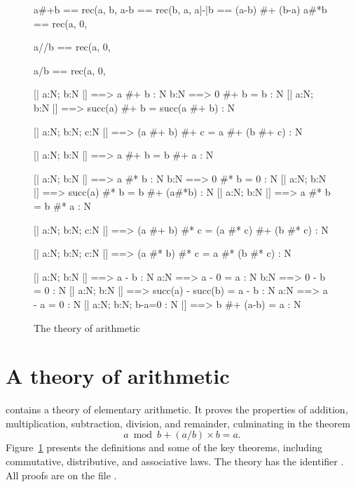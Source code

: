 \begin{figure} 
\begin{ttbox}
           a#+b  == rec(a, b, %
          a-b   == rec(b, a, %
       a|-|b == (a-b) #+ (b-a)  
          a#*b  == rec(a, 0, %

   a//b == rec(a, 0,

   a/b == rec(a, 0,
\end{ttbox}

\begin{ttbox}
        [| a:N;  b:N |] ==> a #+ b : N
             b:N ==> 0 #+ b = b : N
         [| a:N;  b:N |] ==> succ(a) #+ b = succ(a #+ b) : N

         [| a:N;  b:N;  c:N |] ==> 
                  (a #+ b) #+ c = a #+ (b #+ c) : N

       [| a:N;  b:N |] ==> a #+ b = b #+ a : N

       [| a:N;  b:N |] ==> a #* b : N
            b:N ==> 0 #* b = 0 : N
        [| a:N;  b:N |] ==> succ(a) #* b = b #+ (a#*b) : N
      [| a:N;  b:N |] ==> a #* b = b #* a : N

     [| a:N;  b:N;  c:N |] ==> 
                  (a #+ b) #* c = (a #* c) #+ (b #* c) : N

        [| a:N;  b:N;  c:N |] ==> 
                  (a #* b) #* c = a #* (b #* c) : N

       [| a:N;  b:N |] ==> a - b : N
            a:N ==> a - 0 = a : N
       b:N ==> 0 - b = 0 : N
    [| a:N;  b:N |] ==> succ(a) - succ(b) = a - b : N
    a:N ==> a - a = 0 : N
  [| a:N;  b:N;  b-a=0 : N |] ==> b #+ (a-b) = a : N
\end{ttbox}
\caption{The theory of arithmetic} \label{ctt-arith}
\end{figure}


\section{A theory of arithmetic}
{\CTT} contains a theory of elementary arithmetic.  It proves the
properties of addition, multiplication, subtraction, division, and
remainder, culminating in the theorem
\[ a \bmod b + (a/b)\times b = a. \]
Figure~\ref{ctt-arith} presents the definitions and some of the key
theorems, including commutative, distributive, and associative laws.  The
theory has the {\ML} identifier .  All proofs are on
the file .

